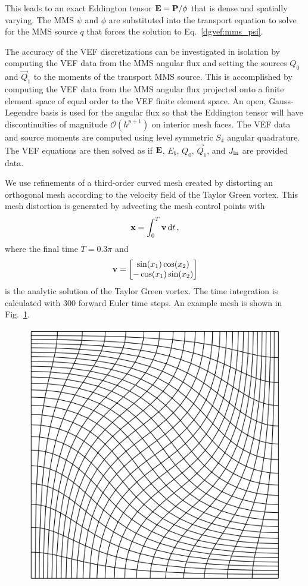 \documentclass[../doc.tex]{subfiles}
\begin{document}
This leads to an exact Eddington tensor $\boldsymbol{\mathrm{E}} = \boldsymbol{\mathrm{P}}/\phi$ that is dense and spatially varying. The MMS $\psi$ and $\phi$ are substituted into the transport equation to solve for the MMS source $q$ that forces the solution to Eq.~\ref{dgvef:mms_psi}. 

The accuracy of the VEF discretizations can be investigated in isolation by computing the VEF data from the MMS angular flux and setting the sources $Q_0$ and $\vec{Q}_1$ to the moments of the transport MMS source. This is accomplished by computing the VEF data from the MMS angular flux projected onto a finite element space of equal order to the VEF finite element space. An open, Gauss-Legendre basis is used for the angular flux so that the Eddington tensor will have discontinuities of magnitude $\mathcal{O}(h^{p+1})$ on interior mesh faces. The VEF data and source moments are computed using level symmetric $S_4$ angular quadrature. The VEF equations are then solved as if $\boldsymbol{\mathrm{E}}$, $E_b$, $Q_0$, $\vec{Q}_1$, and $J_\text{in}$ are provided data. 

We use refinements of a third-order curved mesh created by distorting an orthogonal mesh according to the velocity field of the Taylor Green vortex. This mesh distortion is generated by advecting the mesh control points with 
	\begin{equation}
		\boldsymbol{\mathrm{x}} = \int_0^T \boldsymbol{\mathrm{v}} \mathop{}\!\mathrm{d} t \,,
	\end{equation}
where the final time $T = 0.3 \pi$ and 
	\begin{equation}
		\boldsymbol{\mathrm{v}} = \begin{bmatrix} 
			\sin(x_1) \cos(x_2) \\
			-\cos(x_1)\sin(x_2) 
		\end{bmatrix}
	\end{equation}
is the analytic solution of the Taylor Green vortex. The time integration is calculated with 300 forward Euler time steps. An example mesh is shown in Fig.~\ref{dgvef:tgmesh}. 

\begin{figure}
\centering
\includegraphics[width=.5\textwidth]{data/img/tgmesh0.3.png}
\caption{}
\label{dgvef:tgmesh}
\end{figure}
\end{document}
